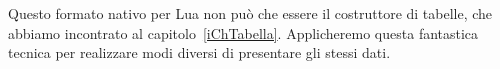 Questo formato nativo per Lua non può che essere il costruttore di tabelle, che
abbiamo incontrato al capitolo~\ref{iChTabella}. Applicheremo questa fantastica
tecnica per realizzare modi diversi di presentare gli stessi dati.













